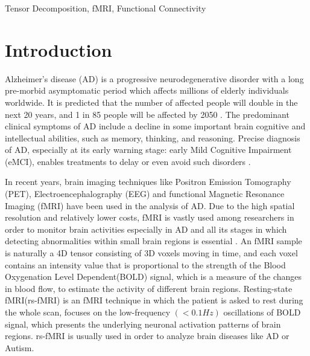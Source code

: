 \documentclass[preprint,12pt]{elsarticle}
\begin{document}
\begin{frontmatter}
		\begin{keyword}
			Tensor Decomposition, fMRI, Functional Connectivity
			
		\end{keyword}
		
	\end{frontmatter}
	
	
	\section{Introduction}
	\label{Intro}
	Alzheimer’s disease (AD) is a progressive neurodegenerative disorder with a long pre-morbid asymptomatic period which affects millions of elderly individuals worldwide\cite{r01}. It is predicted that the number of affected people will double in the next 20 years, and 1 in 85 people will be affected by 2050 \cite{r02}. The predominant clinical symptoms of AD include a decline in some important brain cognitive and intellectual abilities, such as memory, thinking, and reasoning. Precise diagnosis of AD, especially at its early warning stage: early Mild Cognitive Impairment (eMCI), enables treatments to delay or even avoid such disorders \cite{r03}.
	
	In recent years, brain imaging techniques like Positron Emission Tomography (PET)\cite{r21}, Electroencephalography (EEG)\cite{r22}
	and functional Magnetic Resonance Imaging (fMRI)\cite{r23} 
	have been used in the analysis of AD. Due to the high spatial resolution and relatively lower costs, fMRI is vastly used among researchers in order to monitor brain activities especially in AD and all its stages in which detecting abnormalities within small brain regions is essential \cite{r04}. 
	An fMRI sample is naturally a 4D tensor consisting of 3D voxels moving in time, and each voxel contains an intensity value that is proportional to the strength of the Blood Oxygenation Level Dependent(BOLD) signal, which is a measure of the changes in blood flow, to estimate the activity of different brain regions\cite{r07}.
	Resting-state fMRI(rs-fMRI) is an fMRI technique in which the patient is asked to rest during the whole scan, focuses on the low-frequency $\left( < 0.1 Hz \right)$  oscillations of BOLD signal, which presents the underlying neuronal activation patterns of brain regions. rs-fMRI is usually used in order to analyze brain diseases like AD or Autism\cite{r33,r34}.
	
\end{document}

